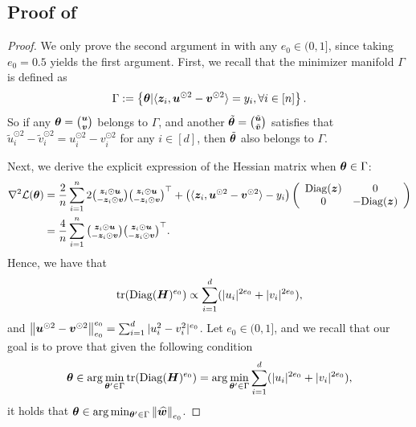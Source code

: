 \subsection{Proof of }
\begin{proof}
We only prove the second argument in  with any $e_0\in(0,1]$, since taking $e_0= 0.5$ yields the first argument. First, we recall that the minimizer manifold $\Gamma$ is defined as 
$$\Gamma := \left\{{\bm{\theta}} | \langle {\bm{z}}_i, {\bm{u}}^{\odot 2} - {\bm{v}}^{\odot 2}\rangle = y_i, \forall i \in [n]\right\}.$$ 
So if any ${\bm{\theta}} = \tbinom{{\bm{u}}}{{\bm{v}}}$ belongs to $\Gamma$, and another $\tilde{{\bm{\theta}}} = \tbinom{\tilde{{\bm{u}}}}{\tilde{{\bm{v}}}}$ satisfies that $\tilde{u}_i^{\odot 2} - \tilde{v}_i^{\odot 2} = u_i^{\odot 2} - v_i^{\odot 2}$ for any $i \in [d]$, then $\tilde{{\bm{\theta}}}$ also belongs to $\Gamma$.

Next, we derive the explicit expression of the Hessian matrix when ${\bm{\theta}} \in \Gamma$: \begin{align*}
        \nabla^2 \mathcal{L} ({\bm{\theta}}) &= \frac{2}{n} \sum_{i=1}^{n}2 \tbinom{{\bm{z}}_i \odot {\bm{u}}}{-{\bm{z}}_i \odot {\bm{v}}} \tbinom{{\bm{z}}_i \odot {\bm{u}}}{-{\bm{z}}_i \odot {\bm{v}}}^\top + \left( \langle {\bm{z}}_i, {\bm{u}}^{\odot 2} - {\bm{v}}^{\odot 2}\rangle - y_i \right) \left(\begin{array}{cc}
        \mathrm{Diag}({\bm{z}}) & 0 \\
       0 & -\mathrm{Diag}({\bm{z}})
    \end{array}\right) \\
    &= \frac{4}{n} \sum_{i=1}^{n} \tbinom{{\bm{z}}_i \odot {\bm{u}}}{-{\bm{z}}_i \odot {\bm{v}}}\tbinom{{\bm{z}}_i \odot {\bm{u}}}{-{\bm{z}}_i \odot {\bm{v}}}^\top.
\end{align*}
Hence, we have that 
$$\text{tr}(\mathrm{Diag}({\bm{H}})^{e_0}) \propto \sum_{i=1}^{d} (|u_i|^{2e_0}+|v_i|^{2e_0}),$$
and $\left\| {\bm{u}}^{\odot 2} - {\bm{v}}^{\odot 2} \right\|_{e_0}^{e_0} = \sum_{i=1}^{d} |u_i^2-v_i^2|^{e_0}$.
Let $e_0 \in (0, 1]$, and we recall that our goal is to prove that given the following condition
\begin{align}
    {\bm{\theta}} \in \arg\min_{{\bm{\theta}}' \in \Gamma} \text{tr}(\mathrm{Diag}({\bm{H}})^{e_0}) = \arg\min_{{\bm{\theta}}' \in \Gamma}\sum_{i=1}^{d}(|u_i|^{2e_0}+|v_i|^{2e_0}),\label{equ:condition-min-tr}
\end{align}
it holds that ${\bm{\theta}} \in \arg \min_{{\bm{\theta}}'\in \Gamma}\left\|\widehat{{\bm{w}}}\right\|_{e_0}$. 


\end{proof}
